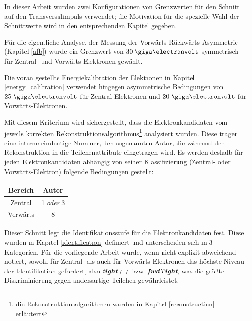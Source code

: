 \begin{description}
        In dieser Arbeit wurden zwei Konfigurationen von Grenzwerten für den
        Schnitt auf den Transversalimpuls verwendet; die Motivation für die
        spezielle Wahl der Schnittwerte wird in den entsprechenden Kapitel
        gegeben.

        Für die eigentliche Analyse, der Messung der Vorwärts-Rückwärts
        Asymmetrie (Kapitel \ref{afb})
        wurde ein Grenzwert von \emph{$30\GeV$} symmetrisch für Zentral- und
        Vorwärts-Elektronen gewählt.

        Die voran gestellte Energiekalibration der Elektronen in Kapitel
        \ref{energy_calibration} verwendet hingegen asymmetrische Bedingungen
        von \emph{$25\GeV$} für Zentral-Elektronen und \emph{$20\GeV$} für
        Vorwärts-Elektronen.

        Mit diesem Kriterium wird sichergestellt, dass die Elektronkandidaten
        vom jeweils korrekten Rekonstruktionsalgorithmus\footnote{die
        Rekonstruktionsalgorithmen wurden in Kapitel \ref{reconstruction}
        erläutert} analysiert wurden. Diese tragen eine interne eindeutige
        Nummer, den sogenannten Autor, die während der Rekonstruktion in die
        Teilchenattribute eingetragen wird. Es werden deshalb für jeden
        Elektronkandidaten abhängig von seiner Klassifizierung (Zentral- oder
        Vorwärts-Elektron) folgende Bedingungen gestellt:
        \begin{table}[h!]
            \centering
            \begin{tabular}{|c|c|}
                \hline
                \bf{Bereich} & \bf{Autor} \\
                \hline \hline
                Zentral  & 1 \textit{oder} 3 \\
                Vorwärts & 8                 \\
                \hline
            \end{tabular}
        \end{table}

        Dieser Schnitt legt die Identifikationsstufe für die Elektronkandidaten
        fest. Diese wurden in Kapitel \ref{identification} definiert und
        unterscheiden sich in 3 Kategorien. Für die vorliegende Arbeit wurde,
        wenn nicht explizit abweichend notiert, sowohl für Zentral- als auch
        für Vorwärts-Elektronen das höchste Niveau der Identifikation
        gefordert, also \textbf{\textit{tight++}} bzw.
        \textbf{\textit{fwdTight}}, was die größte Diskriminierung gegen
        andersartige Teilchen gewährleistet.


\end{description}

